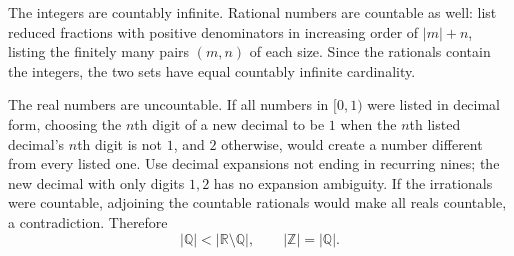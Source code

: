 The integers are countably infinite. Rational numbers are countable as well: list reduced fractions with positive denominators in increasing order of $|m|+n$, listing the finitely many pairs $(m,n)$ of each size. Since the rationals contain the integers, the two sets have equal countably infinite cardinality.

The real numbers are uncountable. If all numbers in $[0,1)$ were listed in decimal form, choosing the $n$th digit of a new decimal to be $1$ when the $n$th listed decimal's $n$th digit is not $1$, and $2$ otherwise, would create a number different from every listed one. Use decimal expansions not ending in recurring nines; the new decimal with only digits $1,2$ has no expansion ambiguity.
If the irrationals were countable, adjoining the countable rationals would make all reals countable, a contradiction. Therefore
\[
\boxed{|\mathbb Q|<|\mathbb R\setminus\mathbb Q|,\qquad |\mathbb Z|=|\mathbb Q|}.
\]
